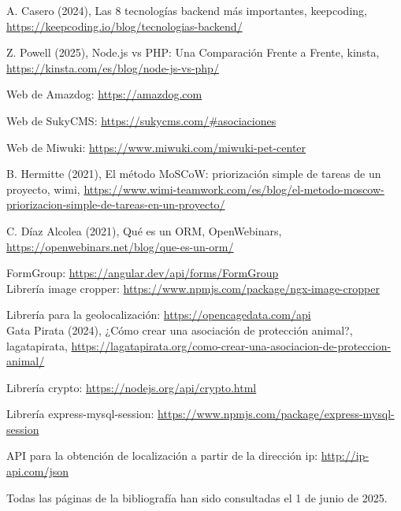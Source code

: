 \begin{thebibliography}{9}
A. Casero (2024), Las 8 tecnologías backend más importantes, keepcoding,  \href{https://keepcoding.io/blog/tecnologias-backend/}{https://keepcoding.io/blog/tecnologias-backend/}

Z. Powell (2025), Node.js vs PHP: Una Comparación Frente a Frente, kinsta, \href{https://kinsta.com/es/blog/node-js-vs-php/}{https://kinsta.com/es/blog/node-js-vs-php/}

Web de Amazdog: \href{https://amazdog.com}{https://amazdog.com}

Web de SukyCMS: \href{https://sukycms.com/\#asociaciones}{https://sukycms.com/\#asociaciones}

Web de Miwuki: \href{https://www.miwuki.com/miwuki-pet-center}{https://www.miwuki.com/miwuki-pet-center}

B. Hermitte (2021), El método MoSCoW: priorización simple de tareas de un proyecto, wimi, \href{https://www.wimi-teamwork.com/es/blog/el-metodo-moscow-priorizacion-simple-de-tareas-en-un-proyecto/}{https://www.wimi-teamwork.com/es/blog/el-metodo-moscow-priorizacion-simple-de-tareas-en-un-proyecto/}

C. Díaz Alcolea (2021), Qué es un ORM, OpenWebinars, \href{https://openwebinars.net/blog/que-es-un-orm/}{https://openwebinars.net/blog/que-es-un-orm/}

FormGroup: \href{https://angular.dev/api/forms/FormGroup}{https://angular.dev/api/forms/FormGroup}\\


Librería image cropper: \href{https://www.npmjs.com/package/ngx-image-cropper}{https://www.npmjs.com/package/ngx-image-cropper}

Librería para la geolocalización: \href{https://opencagedata.com/api}{https://opencagedata.com/api}\\

 Gata Pirata (2024), ¿Cómo crear una asociación de protección animal?, lagatapirata, \href{https://lagatapirata.org/como-crear-una-asociacion-de-proteccion-animal/}{https://lagatapirata.org/como-crear-una-asociacion-de-proteccion-animal/}

 Librería crypto: \href{https://nodejs.org/api/crypto.html}{https://nodejs.org/api/crypto.html}


 Librería express-mysql-session: \href{https://www.npmjs.com/package/express-mysql-session}{https://www.npmjs.com/package/express-mysql-session}

API para la obtención de localización a partir de la dirección ip: \href{http://ip-api.com/json}{http://ip-api.com/json}

\end{thebibliography}
Todas las páginas de la bibliografía han sido consultadas el 1 de junio de 2025.